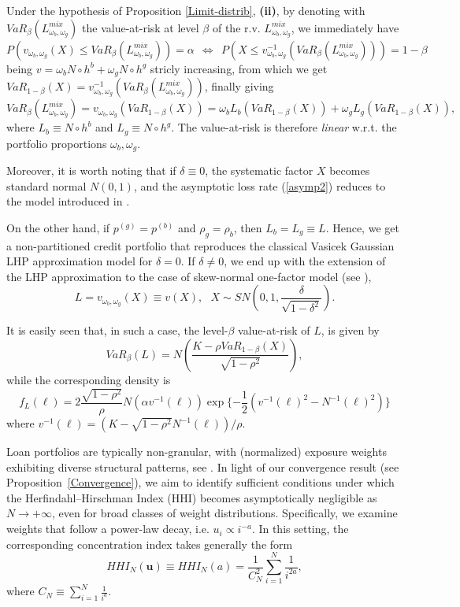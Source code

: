 \documentclass[preprint,12pt]{article}
\begin{document}
{\Remark \label{rem1} Under the hypothesis of Proposition \ref{Limit-distrib}, \textbf{(ii)}, by denoting with $VaR_{\beta}(L^{mix}_{\omega_b,\omega_g})$ the value-at-risk at level $\beta$ of the r.v. $L^{mix}_{\omega_b,\omega_g}$, we immediately have 
$$
P(v_{\omega_b,\omega_g}(X)\leq VaR_{\beta}(L^{mix}_{\omega_b,\omega_g})) = \alpha \ \ \Leftrightarrow \ \ P(X \leq v_{\omega_b,\omega_g}^{-1}(VaR_{\beta}(L^{mix}_{\omega_b,\omega_g}))) = 1-\beta
$$
being $v = \omega_b N\circ h^b + \omega_g N\circ h^g$ stricly increasing, from which we get $VaR_{1-\beta}(X) = v_{\omega_b,\omega_g}^{-1}(VaR_{\beta}(L^{mix}_{\omega_b,\omega_g}))$, finally giving
$$
VaR_{\beta}(L^{mix}_{\omega_b,\omega_g}) = v_{\omega_b,\omega_g}(VaR_{1-\beta}(X)) = \omega_b L_b(VaR_{1-\beta}(X))+\omega_gL_g(VaR_{1-\beta}(X)),
$$
where $L_b\equiv N\circ h^b$ and $L_g\equiv N\circ h^g$. The value-at-risk is therefore \textit{linear} w.r.t. the portfolio proportions $\omega_b, \omega_g$.

\medskip
 
Moreover, it is worth noting that if $\delta \equiv 0$, the systematic factor $X$ becomes standard normal $N(0,1)$, and the asymptotic loss rate (\ref{asymp2}) reduces to the model introduced in \cite{agl21}.

On the other hand, if $p^{(g)} = p^{(b)}$ and $\rho_g = \rho_b$, then $L_b = L_g \equiv L$. Hence, we get a non-partitioned credit portfolio that reproduces the classical Vasicek Gaussian LHP approximation model for $\delta = 0$. If $\delta \neq 0$, we end up with the extension of the LHP approximation to the case of skew-normal one-factor model (see \cite{lp15}),
\begin{equation} \label{asympSN}
    L = v_{\omega_b,\omega_g}(X) \equiv v(X), \ \ \ X \sim SN(0,1,\frac{\delta}{\sqrt{1-\delta^2}}).
\end{equation}

It is easily seen that, in such a case, the level-$\beta$ value-at-risk of $L$, is given by
$$
VaR_{\beta}(L) = N\left(\frac{K-\rho VaR_{1-\beta}(X)}{\sqrt{1-\rho^2}} \right),
$$
while the corresponding density is
$$
f_L(\ell) = 2 \frac{\sqrt{1-\rho^2}}{\rho} N(\alpha v^{-1}(\ell)) \exp\{-\frac{1}{2}(v^{-1}(\ell)^2-N^{-1}(\ell)^2 )\}
$$
where $v^{-1}(\ell) = (K-\sqrt{1-\rho^2}N^{-1}(\ell))/\rho$.
}

\bigskip

Loan portfolios are typically non-granular, with (normalized) exposure weights exhibiting diverse structural patterns, see \cite{Lutke08}. In light of our convergence result (see Proposition~\ref{Convergence}), we aim to identify sufficient conditions under which the Herfindahl–Hirschman Index (HHI) becomes asymptotically negligible as $N \longrightarrow +\infty$, even for broad classes of weight distributions. Specifically, we examine weights that follow a power-law decay, i.e. $u_i \propto i^{-a}$. In this setting, the corresponding concentration index takes generally the form
$$
HHI_N(\mathbf{u}) \equiv HHI_N(a)  = \frac{1}{C_N^2} \sum_{i=1}^N \frac{1}{i^{2a}}, 
$$
where $C_N \equiv \sum_{i=1}^N \frac{1}{i^a}$.
\end{document}
